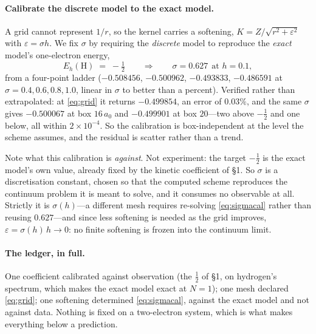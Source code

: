 \documentclass[11pt,a4paper]{article}
\begin{document}
\paragraph{Calibrate the discrete model to the exact model.} A grid cannot represent $1/r$, so the
kernel carries a softening, $K = Z/\sqrt{r^2 + \varepsilon^2}$ with $\varepsilon = \sigma h$. We fix
$\sigma$ by requiring the \emph{discrete} model to reproduce the \emph{exact} model's one-electron
energy,
\begin{equation}
  E_h(\mathrm{H}) \;=\; -\tfrac12 \qquad\Longrightarrow\qquad \sigma = 0.627 \ \ \text{at } h = 0.1 ,
  \label{eq:sigmacal}
\end{equation}
from a four-point ladder ($-0.508456$, $-0.500962$, $-0.493833$, $-0.486591$ at
$\sigma = 0.4, 0.6, 0.8, 1.0$, linear in $\sigma$ to better than a percent). Verified rather than
extrapolated: at \eqref{eq:grid} it returns $-0.499854$, an error of $0.03\%$, and the same
$\sigma$ gives $-0.500067$ at box $16\,a_0$ and $-0.499901$ at box $20$---two above $-\tfrac12$
and one below, all within $2\times 10^{-4}$. So the calibration is box-independent at the level the
scheme assumes, and the residual is scatter rather than a trend.

Note what this calibration is \emph{against}. Not experiment: the target $-\tfrac12$ is the exact
model's own value, already fixed by the kinetic coefficient of \S1. So $\sigma$ is a discretisation
constant, chosen so that the computed scheme reproduces the continuum problem it is meant to solve,
and it consumes no observable at all. Strictly it is $\sigma(h)$---a different mesh requires
re-solving \eqref{eq:sigmacal} rather than reusing $0.627$---and since less softening is needed as
the grid improves, $\varepsilon = \sigma(h)\,h \to 0$: no finite softening is frozen into the
continuum limit.

\paragraph{The ledger, in full.} One coefficient calibrated against observation (the $\tfrac12$ of
\S1, on hydrogen's spectrum, which makes the exact model exact at $N = 1$); one mesh declared
\eqref{eq:grid}; one softening determined \eqref{eq:sigmacal}, against the exact model and not
against data. Nothing is fixed on a two-electron system, which is what makes everything below a
prediction.
\end{document}
